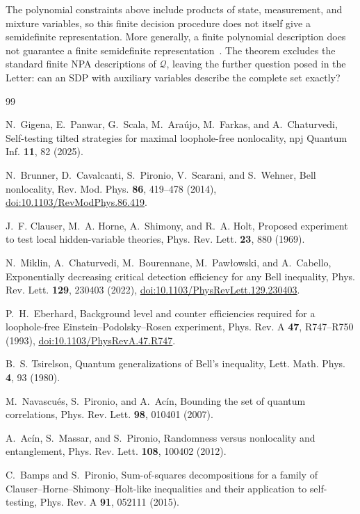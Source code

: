 \documentclass[aps,prl,onecolumn,10pt,superscriptaddress,nofootinbib,longbibliography]{revtex4-2}
\theoremstyle{remark}
\newcommand{\Q}{\mathcal Q}
\begin{document}
The polynomial constraints above include products of state, measurement, and mixture variables, so this finite decision procedure does not itself give a semidefinite representation. More generally, a finite polynomial description does not guarantee a finite semidefinite representation~\cite{Scheiderer2018}. The theorem excludes the standard finite NPA descriptions of $\Q$, leaving the further question posed in the Letter: can an SDP with auxiliary variables describe the complete set exactly?
\begin{thebibliography}{99}

N.~Gigena, E.~Panwar, G.~Scala, M.~Ara\'ujo, M.~Farkas, and A.~Chaturvedi,
Self-testing tilted strategies for maximal loophole-free nonlocality,
npj Quantum Inf. \textbf{11}, 82 (2025).

N.~Brunner, D.~Cavalcanti, S.~Pironio, V.~Scarani, and S.~Wehner,
Bell nonlocality, Rev. Mod. Phys. \textbf{86}, 419--478 (2014),
\href{https://doi.org/10.1103/RevModPhys.86.419}{doi:10.1103/RevModPhys.86.419}.

J.~F. Clauser, M.~A. Horne, A.~Shimony, and R.~A. Holt,
Proposed experiment to test local hidden-variable theories,
Phys. Rev. Lett. \textbf{23}, 880 (1969).

N.~Miklin, A.~Chaturvedi, M.~Bourennane, M.~Paw\l{}owski, and A.~Cabello,
Exponentially decreasing critical detection efficiency for any Bell inequality,
Phys. Rev. Lett. \textbf{129}, 230403 (2022),
\href{https://doi.org/10.1103/PhysRevLett.129.230403}{doi:10.1103/PhysRevLett.129.230403}.

P.~H.~Eberhard,
Background level and counter efficiencies required for a loophole-free Einstein--Podolsky--Rosen experiment,
Phys. Rev. A \textbf{47}, R747--R750 (1993),
\href{https://doi.org/10.1103/PhysRevA.47.R747}{doi:10.1103/PhysRevA.47.R747}.

B.~S. Tsirelson,
Quantum generalizations of Bell's inequality,
Lett. Math. Phys. \textbf{4}, 93 (1980).

M.~Navascu\'es, S.~Pironio, and A.~Ac\'in,
Bounding the set of quantum correlations,
Phys. Rev. Lett. \textbf{98}, 010401 (2007).

A.~Ac\'in, S.~Massar, and S.~Pironio,
Randomness versus nonlocality and entanglement,
Phys. Rev. Lett. \textbf{108}, 100402 (2012).

C.~Bamps and S.~Pironio,
Sum-of-squares decompositions for a family of Clauser--Horne--Shimony--Holt-like inequalities and their application to self-testing,
Phys. Rev. A \textbf{91}, 052111 (2015).


\end{thebibliography}
\end{document}
